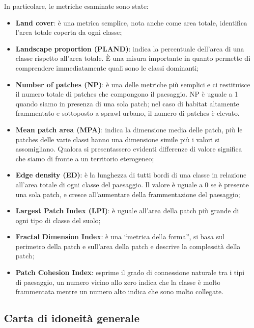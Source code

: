 \documentclass[
  a4paper,
]{book}
\providecommand{\tightlist}{%
  \setlength{\itemsep}{0pt}\setlength{\parskip}{0pt}}
\begin{document}
In particolare, le metriche esaminate sono state:

\begin{itemize}
\tightlist
\item
  \textbf{Land cover}: è una metrica semplice, nota anche come area totale, identifica l'area totale coperta da ogni classe;
\item
  \textbf{Landscape proportion (PLAND)}: indica la percentuale dell'area di una classe rispetto all'area totale. È una misura importante in quanto permette di comprendere immediatamente quali sono le classi dominanti;
\item
  \textbf{Number of patches (NP)}: è una delle metriche più semplici e ci restituisce il numero totale di patches che compongono il paesaggio. NP è uguale a 1 quando siamo in presenza di una sola patch; nel caso di habitat altamente frammentato e sottoposto a sprawl urbano, il numero di patches è elevato.
\item
  \textbf{Mean patch area (MPA)}: indica la dimensione media delle patch, più le patches delle varie classi hanno una dimensione simile più i valori si assomigliano. Qualora si presentassero evidenti differenze di valore significa che siamo di fronte a un territorio eterogeneo;
\item
  \textbf{Edge density (ED)}: è la lunghezza di tutti bordi di una classe in relazione all'area totale di ogni classe del paesaggio. Il valore è uguale a 0 se è presente una sola patch, e cresce all'aumentare della frammentazione del paesaggio;
\item
  \textbf{Largest Patch Index (LPI)}: è uguale all'area della patch più grande di ogni tipo di classe del suolo;
\item
  \textbf{Fractal Dimension Index}: è una ``metrica della forma'', si basa sul perimetro della patch e sull'area della patch e descrive la complessità della patch;
\item
  \textbf{Patch Cohesion Index}: esprime il grado di connessione naturale tra i tipi di paesaggio, un numero vicino allo zero indica che la classe è molto frammentata mentre un numero alto indica che sono molto collegate.
\end{itemize}

\subsection{Carta di idoneità generale}\label{carta-di-idoneituxe0-generale}
\end{document}
